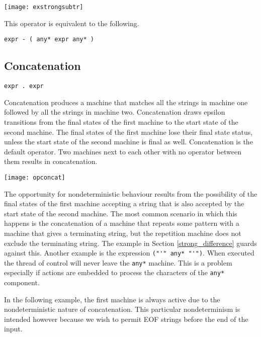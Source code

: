 \documentclass[letterpaper,11pt,oneside]{book}
\newcommand{\verbspace}{\vspace{10pt}}
\newcommand{\graphspace}{\vspace{10pt}}
\begin{document}
\graphspace
\begin{center}
\texttt{[image: exstrongsubtr]}
\end{center}
\graphspace

This operator is equivalent to the following.

\verbspace
\begin{verbatim}
expr - ( any* expr any* )
\end{verbatim}

\subsection{Concatenation}

\verb|expr . expr|
\verbspace

Concatenation produces a machine that matches all the strings in machine one followed by all
the strings in machine two.  Concatenation draws epsilon transitions from the
final states of the first machine to the start state of the second machine. The
final states of the first machine lose their final state status, unless the
start state of the second machine is final as well. 
Concatenation is the default operator. Two machines next to each other with no
operator between them results in concatenation.

\graphspace
\begin{center}
\texttt{[image: opconcat]}
\end{center}
\graphspace

The opportunity for nondeterministic behaviour results from the possibility of
the final states of the first machine accepting a string that is also accepted
by the start state of the second machine.
The most common scenario in which this happens is the
concatenation of a machine that repeats some pattern with a machine that gives
a terminating string, but the repetition machine does not exclude the
terminating string. The example in Section \ref{strong_difference}
guards against this. Another example is the expression \verb|("'" any* "'")|.
When executed the thread of control will
never leave the \verb|any*| machine.  This is a problem especially if actions
are embedded to process the characters of the \verb|any*| component.

In the following example, the first machine is always active due to the
nondeterministic nature of concatenation. This particular nondeterminism is intended
however because we wish to permit EOF strings before the end of the input.
\end{document}
